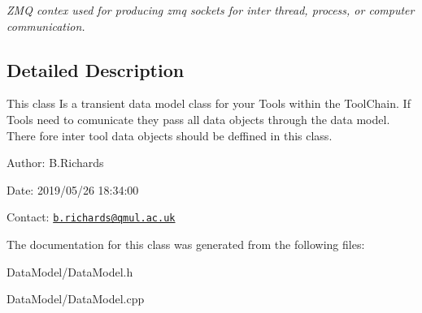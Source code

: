 \begin{DoxyCompactItemize}
\begin{DoxyCompactList}\small\item\em Z\-M\-Q contex used for producing zmq sockets for inter thread, process, or computer communication. \end{DoxyCompactList}\end{DoxyCompactItemize}


\subsection{Detailed Description}
This class Is a transient data model class for your Tools within the Tool\-Chain. If Tools need to comunicate they pass all data objects through the data model. There fore inter tool data objects should be deffined in this class.

\begin{DoxyParagraph}{Author\-:}
B.\-Richards 
\end{DoxyParagraph}
\begin{DoxyParagraph}{Date\-:}
2019/05/26 18\-:34\-:00 
\end{DoxyParagraph}
Contact\-: \href{mailto:b.richards@qmul.ac.uk}{\tt b.\-richards@qmul.\-ac.\-uk} 

The documentation for this class was generated from the following files\-:\begin{DoxyCompactItemize}
\item 
Data\-Model/Data\-Model.\-h\item 
Data\-Model/Data\-Model.\-cpp\end{DoxyCompactItemize}
